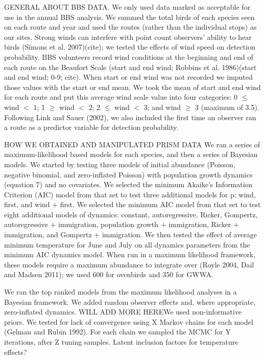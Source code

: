 \documentclass{article}
\begin{document}
GENERAL ABOUT BBS DATA.  We only used data marked as acceptable for
use in the annual BBS analysis.  We summed the total birds of each
species seen on each route and year and used the routes (rather than
the individual stops) as our sites.
Strong winds can interfere with point count observers' ability to hear
birds (Simons et al. 2007)(cite); we tested the effects of wind speed
on detection probability.  BBS volunteers record wind conditions at
the beginning and end of each route on the Beaufort Scale (start and
end wind; Robbins et al. 1986)(start and end wind; 0-9; cite).  When
start or end wind was not recorded we imputed those values with the
start or end mean.  We took the mean of start and end wind for each
route and put this average wind scale value into four categories: 0 $\leq$
wind $<$ 1; 1 $\geq$ wind $<$ 2; 2 $\leq$ wind $<$ 3; and wind $\geq$ 3 (maximum of 3.5).
Following Link and Sauer (2002), we also included the first time an
observer ran a route as a predictor variable for detection
probability.

HOW WE OBTAINED AND MANIPULATED PRISM DATA
We ran a series of maximum-likelihood based models for each species,
and then a series of Bayesian models.  We started by testing three
models of initial abundance (Poisson, negative binomial, and
zero-inflated Poisson) with population growth dynamics (equation 7)
and no covariates.  We selected the minimum Akaike's Information
Criterion (AIC) model from that set to test three additional models
for p: wind, first, and wind + first.   We selected the minimum AIC
model from that set to test eight additional models of dynamics:
constant, autoregressive, Ricker, Gompertz, autoregressive +
immigration, population growth + immigration, Ricker + immigration,
and Gompertz + immigration.  We then tested the effect of average
minimum temperature for June and July on all dynamics parameters from
the minimum AIC dynamics model.  When run in a maximum likelihood
framework, these models require a maximum abundance to integrate over
(Royle 2004, Dail and Madsen 2011); we used 600 for ovenbirds and 350
for GWWA.

We ran the top ranked models from the maximum likelihood analyses in a
Bayesian framework.  We added random observer effects and, where
appropriate, zero-inflated dynamics.  WILL ADD MORE HEREWe used
non-informative priors.  We tested for lack of convergence using X
Markov chains for each model (Gelman and Rubin 1992).  For each chain
we sampled the MCMC for Y iterations, after Z tuning samples.  Latent
inclusion factors for temperature effects?
\end{document}
